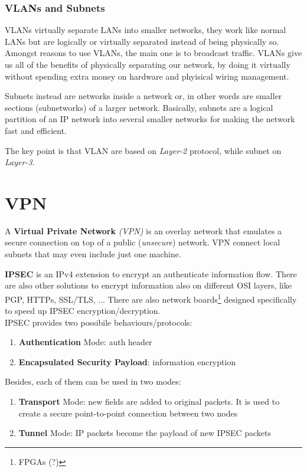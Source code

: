 \subsubsection*{VLANs and Subnets}
VLANs virtually separate LANs into smaller networks,
they work like normal LANs but are logically or virtually separated instead of being
physically so.\\
Amongst reasons to use VLANs, the main one is to broadcast traffic.
VLANs give us all of the
benefits of physically separating our network, by doing it virtually without spending extra money on hardware and phyisical wiring management.

Subnets instead are networks inside a network or, in other words are smaller sections (subnetworks) of a larger network.
Basically, subnets are a logical partition of an IP network into several smaller
networks for making the network fast and efficient.

The key point is that VLAN are based on \textit{Layer-2} protocol, while subnet on \textit{Layer-3}.

\section{VPN}
A \textbf{Virtual Private Network} \textit{(VPN)} is an overlay network that emulates a secure connection on top of a public (\textit{unsecure}) network.
VPN connect local subnets that may even include just one machine.

\textbf{IPSEC} is an IPv4 extension to encrypt an authenticate information flow.
There are also other solutions to encrypt information also on different OSI layers, like PGP, HTTPs, SSL/TLS, ...
There are also network boards\footnote{FPGAs (?)} designed specifically to speed up IPSEC encryption/decryption.\\
IPSEC provides two possibile behaviours/protocols:
\begin{enumerate}
   \item \textbf{Authentication} Mode: auth header
   \item \textbf{Encapsulated Security Payload}: information encryption
\end{enumerate}
Besides, each of them can be used in two modes:
\begin{enumerate}
   \item \textbf{Transport} Mode: new fields are added to original packets.
   It is used to create a secure point-to-point connection between two nodes
   \item \textbf{Tunnel} Mode: IP packets become the payload of new IPSEC packets
\end{enumerate}


